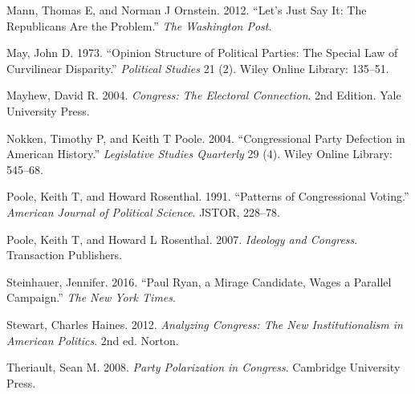 \documentclass[12pt,twoside]{reedthesis}
\begin{document}
  Mann, Thomas E, and Norman J Ornstein. 2012. ``Let's Just Say It: The
  Republicans Are the Problem.'' \emph{The Washington Post}.
  
  May, John D. 1973. ``Opinion Structure of Political Parties: The Special
  Law of Curvilinear Disparity.'' \emph{Political Studies} 21 (2). Wiley
  Online Library: 135--51.
  
  Mayhew, David R. 2004. \emph{Congress: The Electoral Connection}. 2nd
  Edition. Yale University Press.
  
  Nokken, Timothy P, and Keith T Poole. 2004. ``Congressional Party
  Defection in American History.'' \emph{Legislative Studies Quarterly} 29
  (4). Wiley Online Library: 545--68.
  
  Poole, Keith T, and Howard Rosenthal. 1991. ``Patterns of Congressional
  Voting.'' \emph{American Journal of Political Science}. JSTOR, 228--78.
  
  Poole, Keith T, and Howard L Rosenthal. 2007. \emph{Ideology and
  Congress}. Transaction Publishers.
  
  Steinhauer, Jennifer. 2016. ``Paul Ryan, a Mirage Candidate, Wages a
  Parallel Campaign.'' \emph{The New York Times}.
  
  Stewart, Charles Haines. 2012. \emph{Analyzing Congress: The New
  Institutionalism in American Politics}. 2nd ed. Norton.
  
  Theriault, Sean M. 2008. \emph{Party Polarization in Congress}.
  Cambridge University Press.


\end{document}
